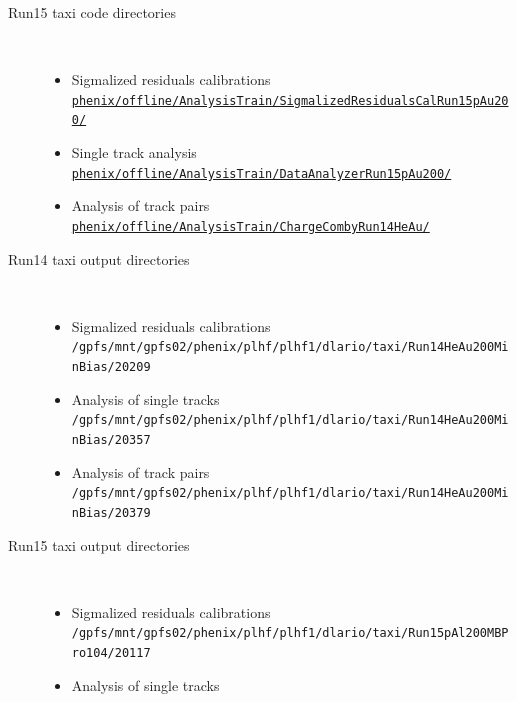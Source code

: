 \begin{description}
\begin{itemize}
         \end{itemize}
		\item[Run15 \pAu taxi code directories]~
			\begin{itemize}
            \item{Sigmalized residuals calibrations} \\
               \href{https://phenix-intra.sdcc.bnl.gov/viewvc/phenix/offline/AnalysisTrain/SigmalizedResidualsCalRun15pAu200/}{\texttt{phenix/offline/AnalysisTrain/SigmalizedResidualsCalRun15pAu200/}}
            \item{Single track analysis} \\
               \href{https://phenix-intra.sdcc.bnl.gov/viewvc/phenix/offline/AnalysisTrain/DataAnalyzerRun15pAu200/}{\texttt{phenix/offline/AnalysisTrain/DataAnalyzerRun15pAu200/}}
            \item{Analysis of track pairs} \\
               \href{https://phenix-intra.sdcc.bnl.gov/viewvc/phenix/offline/AnalysisTrain/ChargeCombyRun15pAu200/}{\texttt{phenix/offline/AnalysisTrain/ChargeCombyRun14HeAu/}}
         \end{itemize}
      \item[Run14 \HeAu taxi output directories]~
         \begin{itemize}
            \item{Sigmalized residuals calibrations} \\
               \texttt{/gpfs/mnt/gpfs02/phenix/plhf/plhf1/dlario/taxi/Run14HeAu200MinBias/20209}
            \item{Analysis of single tracks} \\
               \texttt{/gpfs/mnt/gpfs02/phenix/plhf/plhf1/dlario/taxi/Run14HeAu200MinBias/20357}
            \item{Analysis of track pairs} \\
               \texttt{/gpfs/mnt/gpfs02/phenix/plhf/plhf1/dlario/taxi/Run14HeAu200MinBias/20379}
         \end{itemize}
      \item[Run15 \pAl taxi output directories]~
         \begin{itemize}
            \item{Sigmalized residuals calibrations} \\
               \texttt{/gpfs/mnt/gpfs02/phenix/plhf/plhf1/dlario/taxi/Run15pAl200MBPro104/20117}
            \item{Analysis of single tracks} \\

\end{itemize}
\end{description}
